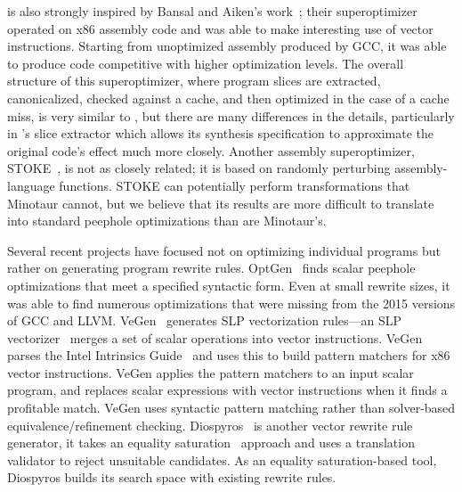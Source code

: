 \minotaur{} is also strongly inspired by Bansal and Aiken's
work~\cite{Bansal06}; their superoptimizer operated on x86 assembly
code and was able to make interesting use of vector instructions.
%
Starting from unoptimized assembly produced by GCC, it was able to
produce code competitive with higher optimization levels.
%
The overall structure of this superoptimizer, where program slices
are extracted, canonicalized, checked against a cache, and then
optimized in the case of a cache miss, is very similar to \minotaur{}, but
there are many differences in the details, particularly in \minotaur's
slice extractor which allows its synthesis specification to
approximate the original code's effect much more closely.
%
Another assembly superoptimizer, STOKE~\cite{stoke, conditionally}, is
not as closely related; it is based on randomly perturbing
assembly-language functions.
%
STOKE can potentially perform transformations that Minotaur cannot,
but we believe that its results are more difficult to translate into
standard peephole optimizations than are Minotaur's.


Several recent projects have focused not on optimizing individual
programs but rather on generating program rewrite rules.
%
OptGen~\cite{optgen} finds scalar peephole optimizations that meet
a specified syntactic form.
%
Even at small rewrite sizes, it was able to find numerous
optimizations that were missing from the 2015 versions of GCC and
LLVM\@.
%
VeGen~\cite{vegen} generates SLP vectorization rules---an SLP
vectorizer~\cite{slp} merges a set of scalar operations into vector
instructions.
%
VeGen parses the Intel Intrinsics Guide~\cite{intelguide} and uses this
to build pattern matchers for x86 vector instructions.
%
VeGen applies the pattern matchers to an input scalar program, and
replaces scalar expressions with vector instructions when it
finds a profitable match.
%
VeGen uses syntactic pattern matching rather than solver-based
equivalence/refinement checking.
%
Diospyros~\cite{diospyros} is another vector rewrite rule generator,
it takes an equality saturation~\cite{equalitysat} approach and uses a translation
validator to reject unsuitable candidates.
As an equality saturation-based tool, Diospyros builds its search space
with existing rewrite rules.


